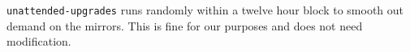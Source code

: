 \texttt{unattended-upgrades} runs randomly within a twelve hour block to smooth out demand on the mirrors. This is fine for our purposes and does not need modification.

%
%	
%
%
%
%

